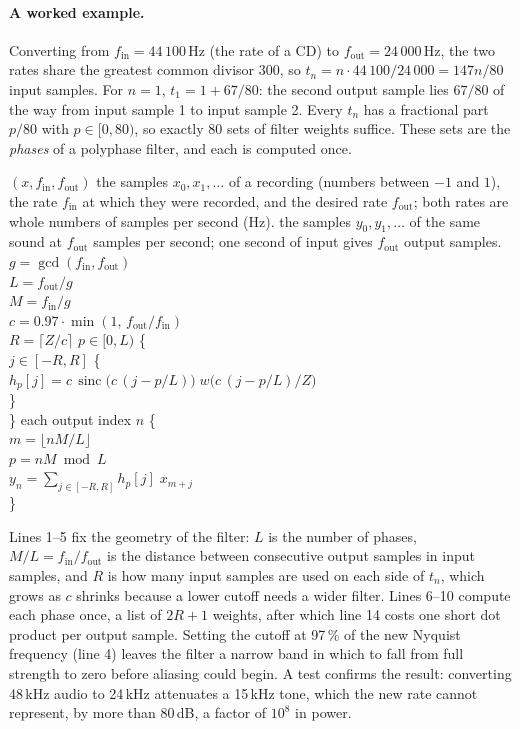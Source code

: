 \paragraph{A worked example.} Converting from $f_\text{in} = 44\,100$\,Hz (the
rate of a CD) to $f_\text{out} = 24\,000$\,Hz, the two rates share the greatest
common divisor 300, so $t_n = n \cdot 44\,100 / 24\,000 = 147n/80$ input
samples. For $n = 1$, $t_1 = 1 + 67/80$: the second output sample lies $67/80$
of the way from input sample 1 to input sample 2. Every $t_n$ has a fractional
part $p/80$ with $p \in [0, 80)$, so exactly 80 sets of filter weights suffice.
These sets are the \emph{phases} of a polyphase filter, and each is computed
once.

\begin{procedure}{$(x, f_\text{in}, f_\text{out})$}
{the samples $x_0, x_1, \dots$ of a recording (numbers between $-1$ and $1$),
the rate $f_\text{in}$ at which they were recorded, and the desired rate
$f_\text{out}$; both rates are whole numbers of samples per second (Hz).}
{the samples $y_0, y_1, \dots$ of the same sound at $f_\text{out}$ samples per
second; one second of input gives $f_\text{out}$ output samples.}
\li $g = \gcd(f_\text{in}, f_\text{out})$ \\
\li $L = f_\text{out} / g$  \\
\li $M = f_\text{in} / g$  \\
\li $c = 0.97 \cdot \min(1,\, f_\text{out}/f_\text{in})$  \\
\li $R = \lceil Z / c \rceil$  \groupend
\li {} $p \in [0, L)$ \{ \\
\li \>  $j \in [-R, R]$ \{ \\
\li \> \> $h_p[j] = c\,\operatorname{sinc}\!\big(c\,(j - p/L)\big)\; w\big(c\,(j - p/L)/Z\big)$ \\
\li \> \} \\
\li \} \groupend
\li {} each output index $n$ \{ \\
\li \> $m = \lfloor nM / L \rfloor$  \\
\li \> $p = nM \bmod L$  \\
\li \> $y_n = \sum_{j \in [-R, R]} h_p[j] \; x_{m+j}$ \\
\li \}
\end{procedure}

Lines 1--5 fix the geometry of the filter: $L$ is the number of phases,
$M/L = f_\text{in}/f_\text{out}$ is the distance between consecutive output
samples in input samples, and $R$ is how many input samples are used on each
side of $t_n$, which grows as $c$ shrinks because a lower cutoff needs a wider
filter. Lines 6--10 compute each phase once, a list of $2R + 1$ weights, after
which line 14 costs one short dot product per output sample. Setting the
cutoff at 97\,\% of the new Nyquist frequency (line 4) leaves the filter a
narrow band in which to fall from full strength to zero before aliasing could
begin. A test confirms the result: converting 48\,kHz audio to 24\,kHz
attenuates a 15\,kHz tone, which the new rate cannot represent, by more than
80\,dB, a factor of $10^{8}$ in power.

